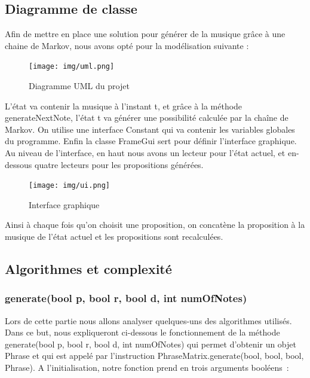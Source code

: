 \documentclass[12pt, a4paper]{article}
\begin{document}
        \subsection{Diagramme de classe}
            Afin de mettre en place une solution pour générer de la musique grâce à une chaine de Markov, nous avons opté pour la modélisation suivante :\\
        
            \begin{figure}[h]
                \center
                \texttt{[image: img/uml.png]}
                \caption{Diagramme UML du projet}
            \end{figure}
        
            L'état va contenir la musique à l'instant t, et grâce à la méthode generateNextNote, l'état t va générer une possibilité calculée par la chaîne de Markov. On utilise une interface Constant qui va contenir les variables globales du programme. Enfin la classe FrameGui sert pour définir l'interface graphique.\\

            Au niveau de l'interface, en haut nous avons un lecteur pour l'état actuel, et en-dessous quatre lecteurs pour les propositions générées.
            
            \begin{figure}[h]
                \center
                \texttt{[image: img/ui.png]}
                \caption{Interface graphique}
            \end{figure}
            
            Ainsi à chaque fois qu'on choisit une proposition, on concatène la proposition à la musique de l'état actuel et les propositions sont recalculées.
            
            
        \subsection{Algorithmes et complexité}
            \subsubsection{generate(bool p, bool r, bool d, int numOfNotes)}
                Lors de cette partie nous allons analyser quelques-uns des algorithmes utilisés.\\
                
                Dans ce but, nous expliqueront ci-dessous le fonctionnement de la méthode generate(bool p, bool r, bool d, int numOfNotes) qui permet d’obtenir un objet Phrase et qui est appelé par l’instruction PhraseMatrix.generate(bool, bool, bool, Phrase).
    A l’initialisation, notre fonction prend en trois arguments booléens :
                
\end{document}
